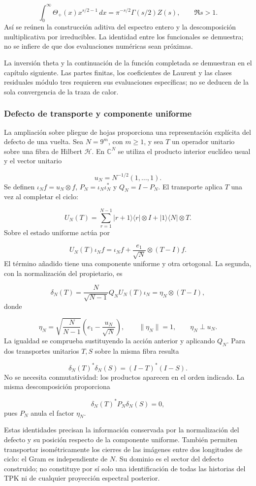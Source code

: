 \[
\int_0^\infty\Theta_+(x)x^{s/2-1}\,dx
=\pi^{-s/2}\Gamma(s/2)Z(s),\qquad \Re s>1.
\]
Así se reúnen la construcción aditiva del espectro entero y la descomposición multiplicativa por irreducibles. La identidad entre los funcionales se demuestra; no se infiere de que dos evaluaciones numéricas sean próximas.

La inversión theta y la continuación de la función completada se demuestran en el capítulo siguiente. Las partes finitas, los coeficientes de Laurent y las clases residuales módulo tres requieren sus evaluaciones específicas; no se deducen de la sola convergencia de la traza de calor.

\subsubsection*{Defecto de transporte y componente uniforme}
La ampliación sobre pliegue de hojas proporciona una representación explícita del defecto de una vuelta. Sea \(N=9^m\), con \(m\ge1\), y sea \(T\) un operador unitario sobre una fibra de Hilbert \(\mathcal H\). En \(\mathbb C^N\) se utiliza el producto interior euclídeo usual y el vector unitario

\[
u_N=N^{-1/2}(1,\ldots,1).
\]
Se definen \(\iota_Nf=u_N\otimes f\), \(P_N=\iota_N\iota_N^*\) y \(Q_N=I-P_N\). El transporte aplica \(T\) una vez al completar el ciclo:

\[
U_N(T)=\sum_{r=1}^{N-1}|r+1\rangle\langle r|\otimes I
+|1\rangle\langle N|\otimes T.
\]
Sobre el estado uniforme actúa por

\[
U_N(T)\iota_N f
=\iota_N f+\frac{e_1}{\sqrt N}\otimes(T-I)f.
\]
El término añadido tiene una componente uniforme y otra ortogonal. La segunda, con la normalización del propietario, es

\[
\delta_N(T)=\frac{N}{\sqrt{N-1}}Q_NU_N(T)\iota_N
=\eta_N\otimes(T-I),
\]
donde

\[
\eta_N=\sqrt{\frac N{N-1}}\left(e_1-\frac{u_N}{\sqrt N}\right),
\qquad \|\eta_N\|=1,\qquad \eta_N\perp u_N.
\]
La igualdad se comprueba sustituyendo la acción anterior y aplicando \(Q_N\). Para dos transportes unitarios \(T,S\) sobre la misma fibra resulta

\[
\delta_N(T)^*\delta_N(S)=(I-T)^*(I-S).
\]
No se necesita conmutatividad: los productos aparecen en el orden indicado. La misma descomposición proporciona

\[
\delta_N(T)^*P_N\delta_N(S)=0,
\]
pues \(P_N\) anula el factor \(\eta_N\).

Estas identidades precisan la información conservada por la normalización del defecto y su posición respecto de la componente uniforme. También permiten transportar isométricamente los cierres de las imágenes entre dos longitudes de ciclo: el Gram es independiente de \(N\). Su dominio es el sector del defecto construido; no constituye por sí solo una identificación de todas las historias del TPK ni de cualquier proyección espectral posterior.

